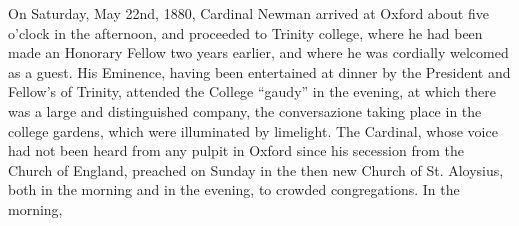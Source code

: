 
On Saturday, May 22nd, 1880,
Cardinal Newman arrived at Oxford about five o'clock in the afternoon,
and proceeded to Trinity college, where he had been made an Honorary
Fellow two years earlier, and where he was cordially welcomed as a
guest. His Eminence, having been entertained at dinner by the
President and Fellow's of Trinity, attended the College ``gaudy'' in the
evening, at which there was a large and distinguished company, the
conversazione taking place in the college gardens, which were
illuminated by limelight. The Cardinal, whose voice had not been heard
from any pulpit in Oxford since his secession from the Church of
England, preached on Sunday in the then new Church of St. Aloysius,
both in the morning and in the evening, to crowded congregations. In
the morning,


